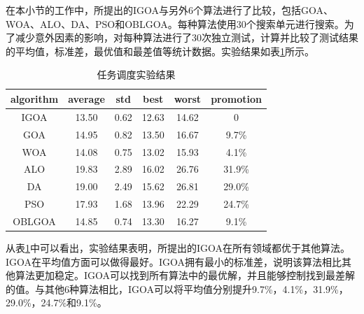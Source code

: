 在本小节的工作中，所提出的IGOA与另外6个算法进行了比较，包括GOA、WOA、ALO、DA、PSO和OBLGOA。每种算法使用30个搜索单元进行搜索。为了减少意外因素的影响，对每种算法进行了30次独立测试，计算并比较了测试结果的平均值，标准差，最优值和最差值等统计数据。实验结果如表\ref{tab:results_task_scheduling}所示。
\begin{table}[!htbp]
    \centering
    \caption{任务调度实验结果}\label{tab:results_task_scheduling}
    \renewcommand\arraystretch{1.3} 
\begin{tabular}{*{6}{c}}
    \hline
    algorithm&average&std&best&worst&promotion\\
    \hline
    IGOA& 13.50&	0.62&	12.63&	14.62&	0    \\
    \hline
    GOA & 14.95&	0.82&	13.50&	16.67&	9.7\%    \\
    \hline
    WOA &14.08&	0.75&	13.02&	15.93&	4.1\%    \\
    \hline
    ALO &19.83&	2.89&	16.02&	26.76&	31.9\%    \\
    \hline
    DA &19.00&	2.49&	15.62&	26.81&	29.0\%    \\
    \hline
    PSO &17.93&	1.68&	13.96&	22.29&	24.7\%\\
    \hline
    OBLGOA &14.85&	0.74&	13.30&	16.27&	9.1\%\\
    \hline
   
   \end{tabular}
\end{table}

从表\ref{tab:results_task_scheduling}中可以看出，实验结果表明，所提出的IGOA在所有领域都优于其他算法。IGOA在平均值方面可以做得最好。IGOA拥有最小的标准差，说明该算法相比其他算法更加稳定。IGOA可以找到所有算法中的最优解，并且能够控制找到最差解的值。与其他6种算法相比，IGOA可以将平均值分别提升9.7\%，4.1\%，31.9\%，29.0\%，24.7\%和9.1\%。

